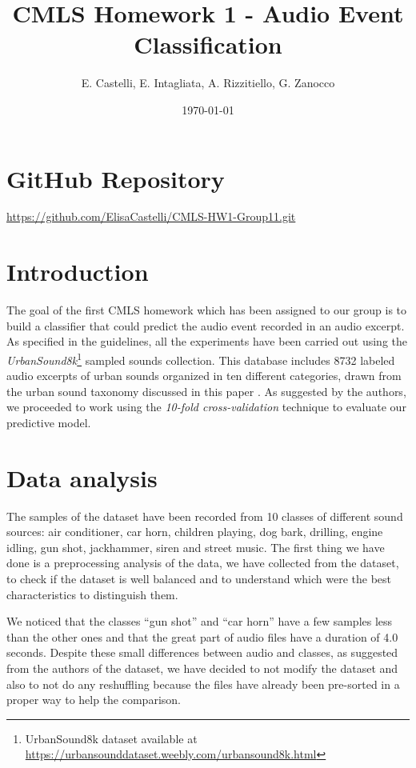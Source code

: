 \documentclass[letterpaper, 12pt]{article}
\begin{document}
	
	\title{CMLS Homework 1 - Audio Event Classification}
	\author{E. Castelli, E. Intagliata, A. Rizzitiello, G. Zanocco}
	\date{\today}
	\maketitle
	
	\section{GitHub Repository}
	\url{https://github.com/ElisaCastelli/CMLS-HW1-Group11.git}
	
	\section{Introduction}
	The goal of the first CMLS homework which has been assigned to our group is to build a classifier that could predict the audio event recorded in an audio excerpt. As specified in the guidelines, all the experiments have been carried out using the \textit{UrbanSound8k}\footnote{UrbanSound8k dataset available at \url{https://urbansounddataset.weebly.com/urbansound8k.html}} sampled sounds collection. This database includes 8732 labeled audio excerpts of urban sounds organized in ten different categories, drawn from the urban sound taxonomy discussed in this paper \cite{sal14}. As suggested by the authors, we proceeded to work using the \textit{10-fold cross-validation} technique to evaluate our predictive model.
	
	
	\section{Data analysis}
	The samples of the dataset have been recorded from 10 classes of different sound sources: air conditioner, car horn, children playing, dog bark, drilling, engine idling, gun shot, jackhammer, siren and street music. The first thing we have done is a preprocessing analysis of the data, we have collected from the dataset, to check if the dataset is well balanced and to understand which were the best characteristics to distinguish them.
	
	We noticed that the classes “gun shot” and “car horn” have a few samples less than the other ones and that the great part of audio files have a duration of 4.0 seconds. Despite these small differences between audio and classes, as suggested from the authors of the dataset, we have decided to not modify the dataset and also to not do any reshuffling because the files have already been pre-sorted in a proper way to help the comparison.
	
\end{document}
